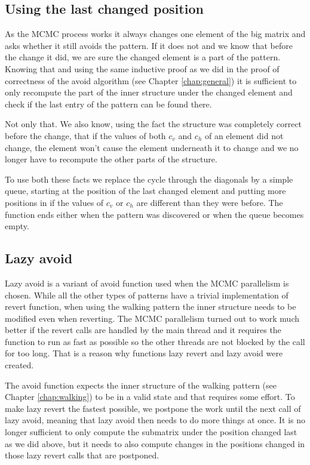 \subsection{Using the last changed position}
As the MCMC process works it always changes one element of the big matrix and asks whether it still avoids the pattern. If it does not and we know that before the change it did, we are sure the changed element is a part of the pattern. Knowing that and using the same inductive proof as we did in the proof of correctness of the avoid algorithm (see Chapter \ref{chap:general}) it is sufficient to only recompute the part of the inner structure under the changed element and check if the last entry of the pattern can be found there.

Not only that. We also know, using the fact the structure was completely correct before the change, that if the values of both $c_v$ and $c_h$ of an element did not change, the element won't cause the element underneath it to change and we no longer have to recompute the other parts of the structure.

To use both these facts we replace the cycle through the diagonals by a simple queue, starting at the position of the last changed element and putting more positions in if the values of $c_v$ or $c_h$ are different than they were before. The function ends either when the pattern was discovered or when the queue becomes empty.

\subsection{Lazy avoid}
Lazy avoid is a variant of avoid function used when the MCMC parallelism is chosen. While all the other types of patterns have a trivial implementation of revert function, when using the walking pattern the inner structure needs to be modified even when reverting. The MCMC parallelism turned out to work much better if the revert calls are handled by the main thread and it requires the function to run as fast as possible so the other threads are not blocked by the call for too long. That is a reason why functions lazy revert and lazy avoid were created.

The avoid function expects the inner structure of the walking pattern (see Chapter \ref{chap:walking}) to be in a valid state and that requires some effort. To make lazy revert the fastest possible, we postpone the work until the next call of lazy avoid, meaning that lazy avoid then needs to do more things at once. It is no longer sufficient to only compute the submatrix under the position changed last as we did above, but it needs to also compute changes in the positions changed in those lazy revert calls that are postponed.

